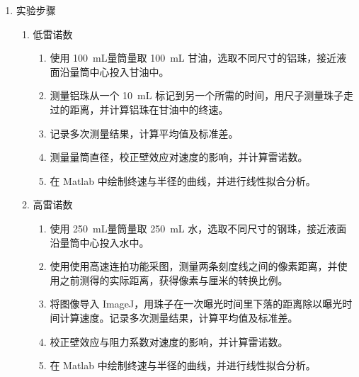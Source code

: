 \documentclass[a4paper]{article}
\begin{document}
\begin{enumerate}[label=\chinese*.,left=0pt]
    \item 实验步骤
    \begin{enumerate}[label=\Alph*., left = 0pt]
        \item 低雷诺数
            \begin{enumerate}[label=\arabic*.,left = 0pt]
                \item 使用 \qty{100}{\milli \L}量筒量取 \qty{100}{\milli L} 甘油，选取不同尺寸的铝珠，接近液面沿量筒中心投入甘油中。
                \item 测量铝珠从一个 \qty{10}{\milli \L} 标记到另一个所需的时间，用尺子测量珠子走过的距离，并计算铝珠在甘油中的终速。
                \item 记录多次测量结果，计算平均值及标准差。
                \item 测量量筒直径，校正壁效应对速度的影响，并计算雷诺数。
                \item 在 Matlab 中绘制终速与半径的曲线，并进行线性拟合分析。
            \end{enumerate}

        \item 高雷诺数
            \begin{enumerate}[label=\arabic*., left = 0pt]
                \item 使用 \qty{250}{\milli \L}量筒量取 \qty{250}{\milli L} 水，选取不同尺寸的钢珠，接近液面沿量筒中心投入水中。
                \item 使用使用高速连拍功能采图，测量两条刻度线之间的像素距离，并使用之前测得的实际距离，获得像素与厘米的转换比例。
                \item 将图像导入 ImageJ，用珠子在一次曝光时间里下落的距离除以曝光时间计算速度。记录多次测量结果，计算平均值及标准差。
                \item 校正壁效应与阻力系数对速度的影响，并计算雷诺数。
                \item 在 Matlab 中绘制终速与半径的曲线，并进行线性拟合分析。
            \end{enumerate}
    \end{enumerate}
    

\end{enumerate}
\end{document}

